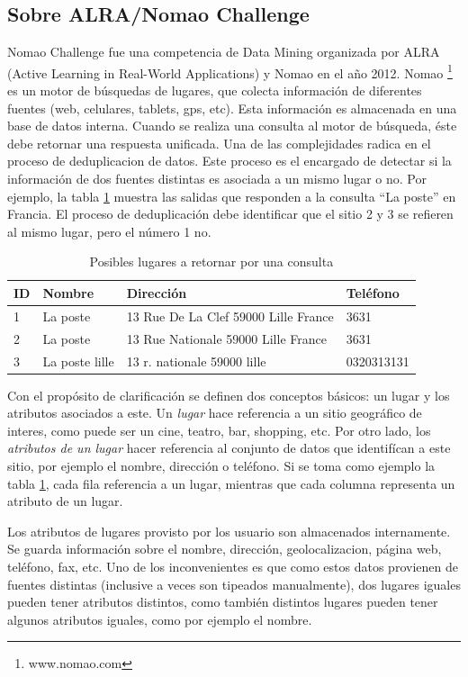 \documentclass[journal]{IEEEtran}
\begin{document}
\subsection{Sobre ALRA/Nomao Challenge}
Nomao Challenge fue una competencia de Data Mining organizada por ALRA 
(Active Learning in Real-World Applications) y Nomao en el año 2012. Nomao 
\footnote{www.nomao.com} es un motor de búsquedas de lugares, que colecta
información de diferentes fuentes (web, celulares, tablets, gps, 
etc). Esta información es almacenada en una base de datos interna. 
Cuando se realiza una consulta al motor de búsqueda, éste debe retornar una
respuesta unificada. Una de las complejidades
radica en el proceso de deduplicacion de datos. Este
proceso es el encargado de detectar si la información de dos fuentes distintas
es asociada a un mismo lugar o no. Por ejemplo, la tabla \ref{table:example1}
muestra las salidas que responden a la consulta ``La poste'' en Francia. El
proceso de deduplicación debe identificar que el sitio 2 y 3 se refieren
al mismo lugar, pero el número 1 no.

\begin{table}[ht!]
\caption{Posibles lugares a retornar por una consulta}
\label{table:example1}
\centering
\begin{tabular}{l | l l l }
ID & Nombre & Dirección & Teléfono  \\
\hline
1 & La poste & 13 Rue De La Clef 59000 Lille France & 3631 \\ 
2 & La poste & 13 Rue Nationale 59000 Lille France & 3631 \\
3 & La poste lille & 13 r. nationale 59000 lille & 0320313131 \\
\end{tabular}
\end{table}

Con el propósito de clarificación se definen dos conceptos básicos:
un lugar y los atributos asociados a este. Un \textit{lugar} hace referencia
a un sitio geográfico de interes, como puede ser un cine, teatro, bar, shopping, etc. 
Por otro lado, los \textit{atributos de un lugar} hacer referencia al conjunto de datos que 
identifícan a este sitio, por ejemplo el nombre, dirección o teléfono. 
Si se toma como ejemplo la tabla  \ref{table:example1}, 
cada fila  referencia a un lugar, 
mientras que cada columna representa un atributo de un lugar.

Los atributos de lugares  provisto por los usuario son almacenados internamente. 
Se guarda información sobre el nombre, dirección, geolocalizacion, página web,
teléfono, fax, etc. Uno de los inconvenientes es que como estos datos
provienen de fuentes distintas (inclusive a veces son tipeados manualmente),
dos lugares iguales pueden tener atributos distintos, como también
distintos lugares pueden tener algunos atributos iguales, como por 
ejemplo el nombre.
\end{document}
